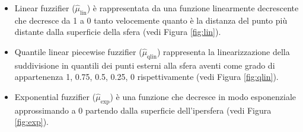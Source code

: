 \documentclass[12pt,italian]{report}
\begin{document}
\begin{itemize}
	\item Linear fuzzifier ($\hat\mu_{\text{lin}}$) è rappresentata da una funzione linearmente decrescente che decresce da 1 a 0 tanto velocemente quanto è la distanza del punto più distante dalla superficie della sfera (vedi Figura \ref{fig:lin}).
	\item Quantile linear piecewise fuzzifier ($\hat \mu_{\text{qlin}}$) rappresenta la linearizzazione della suddivisione in quantili dei punti esterni alla sfera aventi come grado di appartenenza 1, 0.75, 0.5, 0.25, 0 rispettivamente (vedi Figura \ref{fig:qlin}).
	
	\item Exponential fuzzifier ($\hat\mu_{\text{exp}}$) è una funzione che decresce in modo esponenziale approssimando a 0 partendo dalla superficie dell'ipersfera (vedi Figura \ref{fig:exp}).
	
\end{itemize}
\end{document}

